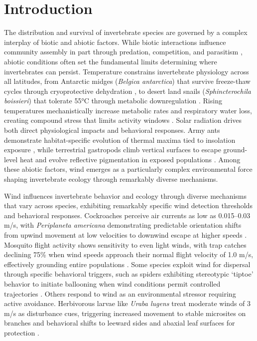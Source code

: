 \usepackage{hyperref}
\usepackage{longtable}

\chapter{Introduction}
\label{ch:introduction}

The distribution and survival of invertebrate species are governed by a complex interplay of biotic and abiotic factors. While biotic interactions influence community assembly in part through predation, competition, and parasitism \citep{blois-heulinDirectIndirectEffects1990,laffertyComparingMechanismsHost2013,miller-terkuilePredatorPreyInteractions2022}, abiotic conditions often set the fundamental limits determining where invertebrates can persist. Temperature constrains invertebrate physiology across all latitudes, from Antarctic midges (\textit{Belgica antarctica}) that survive freeze-thaw cycles through cryoprotective dehydration \citep{everattResponsesInvertebratesTemperature2015}, to desert land snails (\textit{Sphincterochila boissieri}) that tolerate 55°C through metabolic downregulation \citep{schweizerSnailsSunStrategies2019}. Rising temperatures mechanistically increase metabolic rates and respiratory water loss, creating compound stress that limits activity windows \citep{chownWaterLossInsects2011}. Solar radiation drives both direct physiological impacts and behavioral responses. Army ants demonstrate habitat-specific evolution of thermal maxima tied to insolation exposure \citep{baudierExtremeInsolationClimatic2018}, while terrestrial gastropods climb vertical surfaces to escape ground-level heat and evolve reflective pigmentation in exposed populations \citep{schweizerSnailsSunStrategies2019}. Among these abiotic factors, wind emerges as a particularly complex environmental force shaping invertebrate ecology through remarkably diverse mechanisms.

Wind influences invertebrate behavior and ecology through diverse mechanisms that vary across species, exhibiting remarkably specific wind detection thresholds and behavioral responses. Cockroaches perceive air currents as low as 0.015--0.03 m/s, with \textit{Periplaneta americana} demonstrating predictable orientation shifts from upwind movement at low velocities to downwind escape at higher speeds \citep{bellSearchAnemotacticOrientation1979}. Mosquito flight activity shows sensitivity to even light winds, with trap catches declining 75\% when wind speeds approach their normal flight velocity of 1.0 m/s, effectively grounding entire populations \citep{bidlingmayerEffectWindVelocity1974}. Some species exploit wind for dispersal through specific behavioral triggers, such as spiders exhibiting stereotypic `tiptoe' behavior to initiate ballooning when wind conditions permit controlled trajectories \citep{bonteHeritabilitySpiderBallooning2007}. Others respond to wind as an environmental stressor requiring active avoidance. Herbivorous larvae like \textit{Uraba lugens} treat moderate winds of 3 m/s as disturbance cues, triggering increased movement to stable microsites on branches and behavioral shifts to leeward sides and abaxial leaf surfaces for protection \citep{leonardExposureWindAlters2016}.

